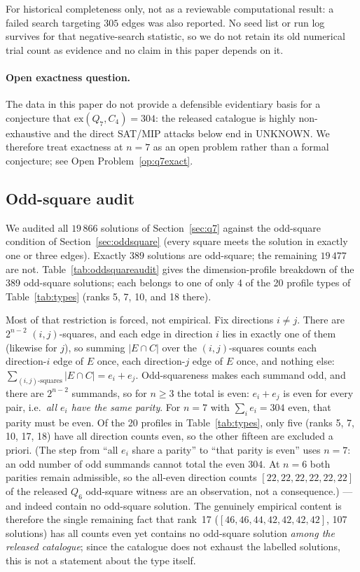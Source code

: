 \documentclass[12pt,a4paper]{article}
\theoremstyle{definition}
\newcommand{\ex}{\mathrm{ex}}
\begin{document}
For historical completeness only, not as a reviewable computational
result: a failed search targeting $305$ edges was also reported. No seed list
or run log survives for that negative-search statistic, so we do not retain
its old numerical trial count as evidence and no claim in this paper depends
on it.

\paragraph{Open exactness question.}
The data in this paper do not provide a defensible evidentiary basis for a
conjecture that $\ex(Q_7,C_4)=304$: the released catalogue is highly
non-exhaustive and the direct SAT/MIP attacks below end in UNKNOWN. We
therefore treat exactness at $n=7$ as an open problem rather than a formal
conjecture; see Open Problem~\ref{op:q7exact}.

\subsection{Odd-square audit}\label{sec:oddsquareaudit}

We audited all $19\,866$ solutions of Section~\ref{sec:q7} against the
odd-square condition of Section~\ref{sec:oddsquare} (every square meets the
solution in exactly one or three edges). Exactly $389$ solutions are
odd-square; the remaining $19\,477$ are not. Table~\ref{tab:oddsquareaudit}
gives the dimension-profile breakdown of the 389 odd-square solutions; each
belongs to one of only 4 of the 20 profile types of
Table~\ref{tab:types} (ranks 5, 7, 10, and 18 there).

Most of that restriction is forced, not empirical. Fix directions $i\ne j$.
There are $2^{n-2}$ $(i,j)$-squares, and each edge in direction $i$ lies in
exactly one of them (likewise for $j$), so summing $|E\cap C|$ over the
$(i,j)$-squares counts each direction-$i$ edge of $E$ once, each
direction-$j$ edge of $E$ once, and nothing else:
$\sum_{(i,j)\text{-squares}}|E\cap C|=e_i+e_j$. Odd-squareness makes each
summand odd, and there are $2^{n-2}$ summands, so for $n\ge3$ the total is
even: $e_i+e_j$ is even for every pair, i.e.\ \emph{all $e_i$ have the same
parity}. For $n=7$ with $\sum_ie_i=304$ even, that parity must be even. Of the
20 profiles in Table~\ref{tab:types}, only five (ranks 5, 7, 10, 17, 18) have
all direction counts even, so the other fifteen are excluded a priori.
(The step from ``all $e_i$ share a parity'' to ``that parity is even'' uses
$n=7$: an odd number of odd summands cannot total the even $304$. At $n=6$ both
parities remain admissible, so the all-even direction counts
$[22,22,22,22,22,22]$ of the released $Q_6$ odd-square witness are an
observation, not a consequence.) --- and
indeed contain no odd-square solution. The genuinely empirical content is
therefore the single remaining fact that rank~17
($[46,46,44,42,42,42,42]$, 107 solutions) has all counts even yet contains no
odd-square solution \emph{among the released catalogue}; since the catalogue
does not exhaust the labelled solutions, this is not a statement about the
type itself.
\end{document}
